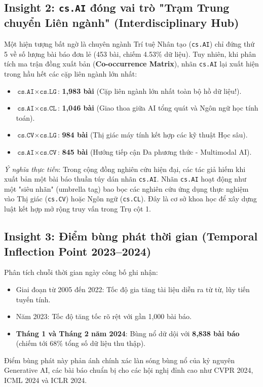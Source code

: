 \subsection{Insight 2: \texttt{cs.AI} đóng vai trò "Trạm Trung chuyển Liên ngành" (Interdisciplinary Hub)}
Một hiện tượng bất ngờ là chuyên ngành Trí tuệ Nhân tạo (\texttt{cs.AI}) chỉ đứng thứ 5 về số lượng bài báo đơn lẻ (453 bài, chiếm 4.53\% dữ liệu). Tuy nhiên, khi phân tích ma trận đồng xuất bản (\textbf{Co-occurrence Matrix}), nhãn \texttt{cs.AI} lại xuất hiện trong hầu hết các cặp liên ngành lớn nhất:
\begin{itemize}
  \item $\texttt{cs.AI} \times \texttt{cs.LG}$: \textbf{1,983 bài} (Cặp liên ngành lớn nhất toàn bộ hồ dữ liệu!).
  \item $\texttt{cs.AI} \times \texttt{cs.CL}$: \textbf{1,046 bài} (Giao thoa giữa AI tổng quát và Ngôn ngữ học tính toán).
  \item $\texttt{cs.CV} \times \texttt{cs.LG}$: \textbf{984 bài} (Thị giác máy tính kết hợp các kỹ thuật Học sâu).
  \item $\texttt{cs.AI} \times \texttt{cs.CV}$: \textbf{845 bài} (Hướng tiếp cận Đa phương thức - Multimodal AI).
\end{itemize}
\textit{Ý nghĩa thực tiễn}: Trong cộng đồng nghiên cứu hiện đại, các tác giả hiếm khi xuất bản một bài báo thuần túy dán nhãn \texttt{cs.AI}. Nhãn \texttt{cs.AI} hoạt động như một "siêu nhãn" (umbrella tag) bao bọc các nghiên cứu ứng dụng thực nghiệm vào Thị giác (\texttt{cs.CV}) hoặc Ngôn ngữ (\texttt{cs.CL}). Đây là cơ sở khoa học để xây dựng luật kết hợp mở rộng truy vấn trong Trụ cột 1.

\subsection{Insight 3: Điểm bùng phát thời gian (Temporal Inflection Point 2023--2024)}
Phân tích chuỗi thời gian ngày công bố ghi nhận:
\begin{itemize}
  \item Giai đoạn từ 2005 đến 2022: Tốc độ gia tăng tài liệu diễn ra từ từ, lũy tiến tuyến tính.
  \item Năm 2023: Tốc độ tăng tốc rõ rệt với gần 1,000 bài báo.
  \item \textbf{Tháng 1 và Tháng 2 năm 2024}: Bùng nổ dữ dội với \textbf{8,838 bài báo} (chiếm tới 68\% tổng số dữ liệu thu thập).
\end{itemize}
Điểm bùng phát này phản ánh chính xác làn sóng bùng nổ của kỷ nguyên Generative AI, các bài báo chuẩn bị cho các hội nghị đỉnh cao như CVPR 2024, ICML 2024 và ICLR 2024.

